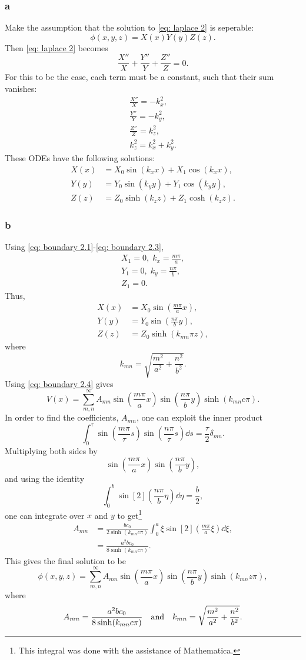 \documentclass{article}
\begin{document}
\begin{multicols*}{2}
	\subsubsection*{a}
	Make the assumption that the solution to \ref{eq: laplace 2} is seperable:
	\[
		\phi(x,y,z) = X(x)Y(y)Z(z).
	\]
	Then \ref{eq: laplace 2} becomes
	\[
		\frac{X''}{X}+\frac{Y''}{Y}+\frac{Z''}{Z} = 0.
	\]
	For this to be the case, each term must be a constant, such that their sum vanishes:
	\begin{gather*}
		\frac{X''}{X} = -k_x^2,\\
		\frac{Y''}{Y} = -k_y^2,\\
		\frac{Z''}{Z} = k_z^2,\\
		k_z^2 = k_x^2 + k_y^2.
	\end{gather*}
	These ODEs have the following solutions:
	\begin{align*}
		X(x) &= X_0 \sin(k_x x) + X_1 \cos(k_x x),\\
		Y(y) &= Y_0 \sin(k_y y) + Y_1 \cos(k_y y),\\
		Z(z) &= Z_0 \sinh(k_z z) + Z_1 \cosh(k_z z).
	\end{align*}

	\subsubsection*{b}
	Using \ref{eq: boundary 2.1}-\ref{eq: boundary 2.3},
	\begin{gather*}
		X_1 = 0, \; k_x = \frac{m\pi}{a},\\
		Y_1 = 0, \; k_y = \frac{n\pi}{b},\\
		Z_1 = 0.
	\end{gather*}
	Thus,
	\begin{align*}
		X(x) &= X_0 \sin(\frac{m\pi}{a} x),\\
		Y(y) &= Y_0 \sin(\frac{n\pi}{b} y),\\
		Z(z) &= Z_0 \sinh(k_{mn}\pi z),
	\end{align*}
	where
	\[
		k_{mn} = \sqrt{\frac{m^2}{a^2}+\frac{n^2}{b^2}}.
	\]
	Using \ref{eq: boundary 2.4} gives
	\[
		V(x) = \sum_{m,n}^\infty A_{mn} \sin(\frac{m\pi}{a} x)\sin(\frac{n\pi}{b}y)
		\sinh(k_{mn}c\pi).
	\]
	In order to find the coefficients, $A_{mn}$, one can exploit the inner product
	\[
		\int_0^\tau \sin(\frac{m\pi}{\tau}s)\sin(\frac{n\pi}{\tau}s)\dd{s} = \frac{\tau}{2}\delta_{mn}.
	\]
	Multiplying both sides by
	\[
		\sin(\frac{m\pi}{a} x)\sin(\frac{n\pi}{b}y),
	\]
	and using the identity
	\[
		\int_0^b \sin[2](\frac{n\pi}{b}\eta)\dd{\eta} = \frac{b}{2},
	\]
	one can integrate over $x$ and $y$ to get\footnote{This integral was done with the assistance of Mathematica.}
	\begin{align*}
		A_{mn}
		&= \frac{b c_0}{2\sinh(k_{mn}c\pi)}\int_0^a \xi\sin[2](\frac{m\pi}{a}\xi)\dd{\xi},\\
		&= \frac{a^2 b c_0}{8\sinh(k_{mn}c\pi)}.
	\end{align*}
	This gives the final solution to be
	\[
		\phi(x,y,z) = \sum_{m,n}^\infty A_{mn} \sin(\frac{m\pi}{a} x)\sin(\frac{n\pi}{b}y)
		\sinh(k_{mn}z\pi),
	\]
	where
	\[
		A_{mn} = \frac{a^2 b c_0}{8\sinh(k_{mn}c\pi)} \qq{and} k_{mn} = \sqrt{\frac{m^2}{a^2}+\frac{n^2}{b^2}}.
	\]


\end{multicols*}
\end{document}
